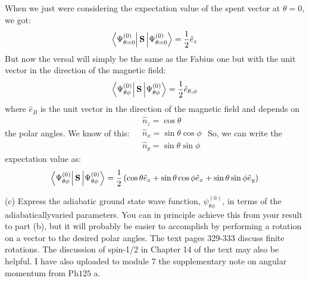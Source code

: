 \documentclass[12pt]{article}
\begin{document}
\subsection{}
When we just were considering the expectation value of the spent vector at $\theta = 0$, we got:
\begin{equation}
  \bra{\Psi _{\theta =0}^{(0)}}\mathbf{S}\ket{\Psi _{\theta =0}^{(0)}} = \frac{1}{2}\hat{e}_{z}
\end{equation}
But now the versal will simply be the same as the Fabius one but with the unit vector in the direction of the magnetic field:
\begin{equation}
  \bra{\Psi _{\theta \phi}^{(0)}}\mathbf{S}\ket{\Psi _{\theta \phi}^{(0)}} = \frac{1}{2}\hat{e}_{\theta , \phi}
\end{equation}
where $\hat{e}_{B}$ is the unit vector in the direction of the magnetic field and depends on the polar angles.
We know of this:
$\begin{aligned} & \hat{n}_z=\cos \theta \\ & \hat{n}_x=\sin \theta \cos \phi \\ & \hat{n}_y=\sin \theta \sin \phi\end{aligned}$
So, we can write the expectation value as:
\begin{equation}
  \bra{\Psi _{\theta \phi}^{(0)}}\mathbf{S}\ket{\Psi _{\theta \phi}^{(0)}} = \frac{1}{2}\left( \cos \theta \hat{e}_{z} + \sin \theta \cos \phi \hat{e}_{x} + \sin \theta \sin \phi \hat{e}_{y}\right)
\end{equation}

(c) Express the adiabatic ground state wave function, $\psi_{\theta \phi}^{(0)}$, in terms of the adiabaticallyvaried parameters. You can in principle achieve this from your result to part (b), but it will probably be easier to accomplish by performing a rotation on a vector to the desired polar angles. The text pages 329-333 discuss finite rotations. The discussion of spin-1/2 in Chapter 14 of the text may also be helpful. I have also uploaded to module 7 the supplementary note on angular momentum from $\mathrm{Ph} 125$ a.
\end{document}
